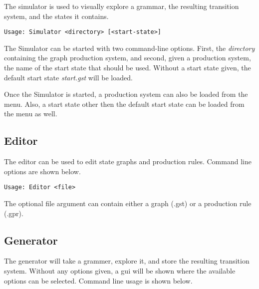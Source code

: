 The simulator is used to visually explore a grammar, the resulting transition system, and the states it contains.

\begin{verbatim}
Usage: Simulator <directory> [<start-state>]
\end{verbatim}

The Simulator can be started with two command-line options. First, the \emph{directory} containing the graph production system, and second, given a production system, the name of the start state that should be used. Without a start state given, the default start state \emph{start.gst} will be loaded.

Once the Simulator is started, a production system can also be loaded from the menu. Also, a start state other then the default start state can be loaded from the menu as well.

\subsection{Editor}

The editor can be used to edit state graphs and production rules. Command line options are shown below.

\begin{verbatim}
Usage: Editor <file>
\end{verbatim}

The optional file argument can contain either a graph (.gst) or a production rule (.gpr).

\subsection{Generator}

The generator will take a grammer, explore it, and store the resulting transition system. Without any options given, a gui will be shown where the available options can be selected. Command line usage is shown below.

